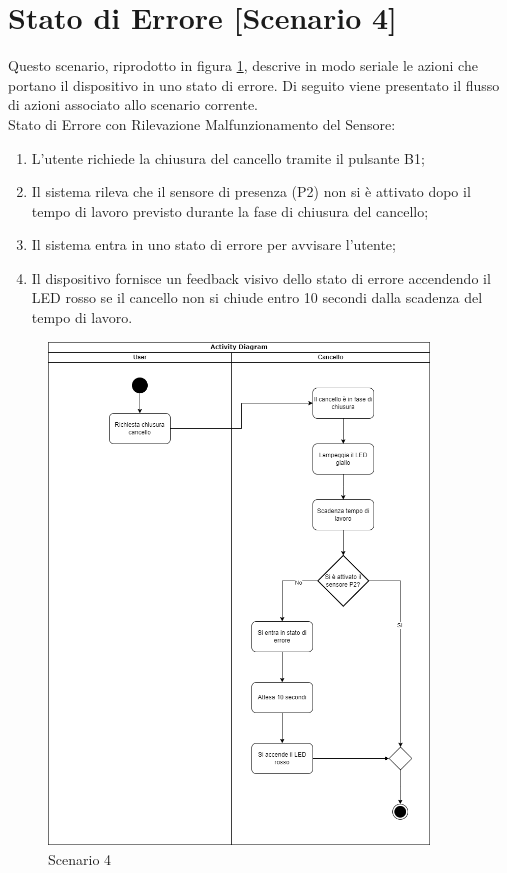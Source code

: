 \section{Stato di Errore [Scenario 4]}
Questo scenario, riprodotto in figura \ref{scenario4}, descrive in modo seriale le azioni che portano il dispositivo in uno stato di errore.
Di seguito viene presentato il flusso di azioni associato allo scenario corrente. \\

\noindent Stato di Errore con Rilevazione Malfunzionamento del Sensore:

\begin{enumerate}
    \item L’utente richiede la chiusura del cancello tramite il pulsante B1;
    
    \item Il sistema rileva che il sensore di presenza (P2) non si è attivato dopo il tempo di lavoro previsto durante la fase di chiusura del cancello;
    
    \item Il sistema entra in uno stato di errore per avvisare l’utente;
    
    \item Il dispositivo fornisce un feedback visivo dello stato di errore accendendo il LED rosso se il cancello non si chiude entro 10 secondi dalla scadenza del tempo di lavoro.
\end{enumerate}

\begin{figure}[H]
    \centering
    \includegraphics[width=0.9\textwidth]{figures/scenario4.png}
    \caption{Scenario 4}
    \label{scenario4}
\end{figure}


